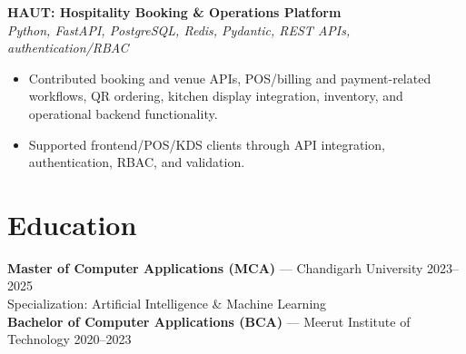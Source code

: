 \documentclass[a4paper,10pt]{article}
\newcommand{\project}[2]{\vspace{3pt}\textbf{#1}\\{\small\textit{#2}}\vspace{1pt}}
\begin{document}
\project{HAUT: Hospitality Booking \& Operations Platform}
{Python, FastAPI, PostgreSQL, Redis, Pydantic, REST APIs, authentication/RBAC}
\begin{itemize}
  \item Contributed booking and venue APIs, POS/billing and payment-related workflows, QR ordering,
  kitchen display integration, inventory, and operational backend functionality.
  \item Supported frontend/POS/KDS clients through API integration, authentication, RBAC, and validation.
\end{itemize}

\section*{Education}
\textbf{Master of Computer Applications (MCA)} --- Chandigarh University \hfill 2023--2025\\
Specialization: Artificial Intelligence \& Machine Learning\\[3pt]
\textbf{Bachelor of Computer Applications (BCA)} --- Meerut Institute of Technology \hfill 2020--2023
\end{document}
